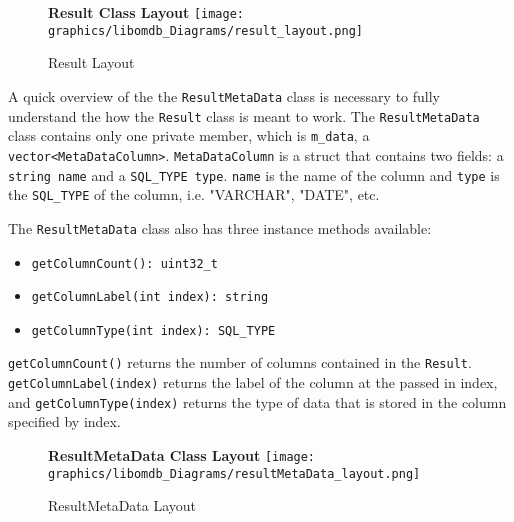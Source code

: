 \documentclass[letterpaper, 12pt]{article}
\renewcommand{\includegraphics}[2][]{\fbox{}}
\begin{document}
  \begin{figure}
    \centering
    \textbf{Result Class Layout}
    \texttt{[image: graphics/libomdb\_Diagrams/result\_layout.png]}
    \caption{Result Layout}
  \end{figure}
  \par\vspace{\baselineskip}
  A quick overview of the the \lstinline[basicstyle=\ttfamily]|ResultMetaData| class 
  is necessary to fully understand the how the 
  \lstinline[basicstyle=\ttfamily]|Result| class is meant to work. 
  The \lstinline[basicstyle=\ttfamily]|ResultMetaData| class contains only one 
  private member, which is 
  \lstinline[basicstyle=\ttfamily]|m_data|, a 
  \lstinline[basicstyle=\ttfamily]|vector<MetaDataColumn>|. 
  \lstinline[basicstyle=\ttfamily]|MetaDataColumn| is a struct that contains two fields: 
  a \lstinline[basicstyle=\ttfamily]|string name| and a 
  \lstinline[basicstyle=\ttfamily]|SQL_TYPE type|. \lstinline[basicstyle=\ttfamily]|name|
  is the name of the column and \lstinline[basicstyle=\ttfamily]|type| is the 
  \lstinline[basicstyle=\ttfamily]|SQL_TYPE| of the column, i.e. "VARCHAR", "DATE", etc.
  \par\vspace{\baselineskip}
  The \lstinline[basicstyle=\ttfamily]|ResultMetaData| class also has 
  three instance methods available:
  \begin{itemize}
    \item \lstinline[basicstyle=\ttfamily]|getColumnCount(): uint32_t|
    \item \lstinline[basicstyle=\ttfamily]|getColumnLabel(int index): string|
    \item \lstinline[basicstyle=\ttfamily]|getColumnType(int index): SQL_TYPE|
  \end{itemize}

  \lstinline[basicstyle=\ttfamily]|getColumnCount()| returns the number of 
  columns contained in the \lstinline[basicstyle=\ttfamily]|Result|.
  \lstinline[basicstyle=\ttfamily]|getColumnLabel(index)| returns the label of the 
  column at the passed in index, and 
  \lstinline[basicstyle=\ttfamily]|getColumnType(index)| returns the type of data that
  is stored in the column specified by index.  
  
  \begin{figure}
    \centering
    \textbf{ResultMetaData Class Layout}
    \texttt{[image: graphics/libomdb\_Diagrams/resultMetaData\_layout.png]}
    \caption{ResultMetaData Layout}
  \end{figure}
  
\end{document}
